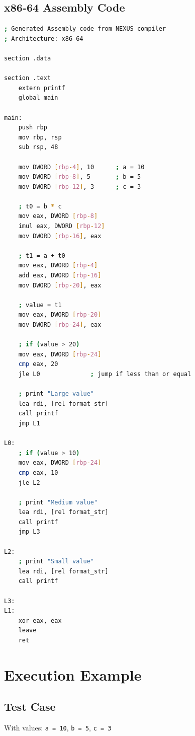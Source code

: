 \documentclass[12pt,a4paper]{report}
\begin{document}
\subsection{x86-64 Assembly Code}

\begin{lstlisting}[language=bash, caption={Generated x86-64 Assembly for Program 2}]
; Generated Assembly code from NEXUS compiler
; Architecture: x86-64

section .data

section .text
    extern printf
    global main

main:
    push rbp
    mov rbp, rsp
    sub rsp, 48

    mov DWORD [rbp-4], 10      ; a = 10
    mov DWORD [rbp-8], 5       ; b = 5
    mov DWORD [rbp-12], 3      ; c = 3
    
    ; t0 = b * c
    mov eax, DWORD [rbp-8]
    imul eax, DWORD [rbp-12]
    mov DWORD [rbp-16], eax
    
    ; t1 = a + t0
    mov eax, DWORD [rbp-4]
    add eax, DWORD [rbp-16]
    mov DWORD [rbp-20], eax
    
    ; value = t1
    mov eax, DWORD [rbp-20]
    mov DWORD [rbp-24], eax
    
    ; if (value > 20)
    mov eax, DWORD [rbp-24]
    cmp eax, 20
    jle L0              ; jump if less than or equal
    
    ; print "Large value"
    lea rdi, [rel format_str]
    call printf
    jmp L1
    
L0:
    ; if (value > 10)
    mov eax, DWORD [rbp-24]
    cmp eax, 10
    jle L2
    
    ; print "Medium value"
    lea rdi, [rel format_str]
    call printf
    jmp L3
    
L2:
    ; print "Small value"
    lea rdi, [rel format_str]
    call printf
    
L3:
L1:
    xor eax, eax
    leave
    ret
\end{lstlisting}

\section{Execution Example}

\subsection{Test Case}

With values: \texttt{a = 10}, \texttt{b = 5}, \texttt{c = 3}
\end{document}
